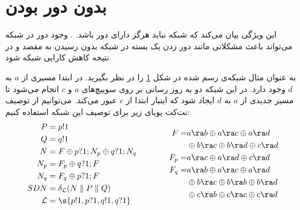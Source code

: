 \section{بدون دور بودن}
این ویژگی بیان می‌کند که شبکه‌ نباید هرگز دارای دور باشد.
\cite{foerster2018survey}.
وجود دور در شبکه می‌تواند باعث مشکلاتی مانند دور زدن یک بسته در شبکه بدون رسیدن به مقصد و در نتیجه کاهش کارایی شبکه شود.
\begin{figure}
    \centering
    \caption{ }
    \label{fig:loop}
\end{figure}
به عنوان مثال شبکه‌ی رسم شده در شکل
\ref{fig:loop}
را در نظر بگیرید.
در ابتدا مسیری از
$a$
به
$d$
وجود دارد.
در این شبکه دو به روز رسانی بر روی سوییچ‌های
$a$
و
$c$
انجام می‌شود تا مسیر جدیدی از
$a$
به
$d$
ایجاد شود که اینبار ابتدا از
$c$
عبور می‌کند.
می‌توانیم از توصیف نت‌کت پویای زیر برای توصیف این شبکه استفاده کنیم:
\begin{equation*}
    \begin{aligned}
        P           & = p!1                                             \\
        Q           & = q!1                                             \\
        N           & = F \oplus p?1;N_p \oplus q?1;N_q                 \\
        N_p         & = F_p \oplus q?1;F                                \\
        N_q         & = F_q \oplus p?1;F                                \\
        SDN         & = \delta_{\mathcal{L}}(N \parallel P \parallel Q) \\
        \mathcal{L} & = \s{p!1,p?1,q!1,q?1}
    \end{aligned}
    \qquad \qquad
    \begin{aligned}
        F    = & a\ra b \oplus a\ra c \oplus a\ra d               \\
               & \oplus b\ra c \oplus b\ra d \oplus c\ra d        \\
        F_p  = & a\ra c \oplus a\ra d \oplus c\ra d               \\
        F_q  = & a\ra b \oplus a\ra c \oplus a\ra d               \\
               & \oplus b\ra c \oplus b\ra b \oplus b\ra d        \\
               & \oplus        c\ra b \oplus c\ra c \oplus c\ra d
    \end{aligned}
\end{equation*}

